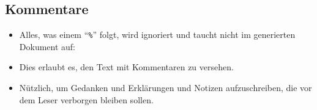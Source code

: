 \subsection{Kommentare}

\begin{frame}[fragile]{\subsecname}
    \begin{itemize}
        \item Alles, was einem \enquote{\texttt{\%}} folgt, wird ignoriert und taucht nicht im
            generierten Dokument auf:
        \item Dies erlaubt es, den Text mit \alert{Kommentaren} zu versehen.
        \item Nützlich, um Gedanken und Erklärungen und Notizen aufzuschreiben, die vor dem Leser
            verborgen bleiben sollen.
    \end{itemize}
\end{frame}
